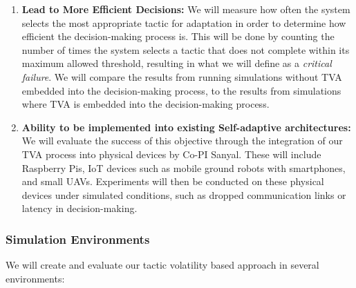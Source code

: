 \documentclass[11pt]{proposalnsf}
\newcommand{\dan}[1]{\textcolor{blue}{{\it [Dan says: #1]}}}
\newcommand{\jeff}[1]{\textcolor{magenta}{{\it [Jeff: #1]}}}
\begin{document}
\begin{sloppypar}
\begin{enumerate}[noitemsep]


    \item \textbf{Lead to More Efficient Decisions:} We will measure how often the system selects the most appropriate tactic for adaptation in order to determine how efficient the decision-making process is. This will be done by counting the number of times the system selects a tactic that does not complete within its maximum allowed threshold, resulting in what we will define as a \textit{critical failure}. We will compare the results from running simulations without TVA embedded into the decision-making process, to the results from simulations where TVA is embedded into the decision-making process. 
   
    


  	\item \textbf{Ability to be implemented into existing Self-adaptive architectures:} We will evaluate the success of this objective through the integration of our TVA process into physical devices by Co-PI Sanyal. These will include Raspberry Pis, IoT devices such as mobile ground robots with smartphones, and small UAVs. Experiments will then be conducted on these physical devices under simulated conditions, such as dropped communication links or latency in decision-making. 

\end{enumerate}


\subsubsection*{Simulation Environments}
We will create and evaluate our tactic volatility based approach in several environments:


\end{sloppypar}
\end{document}
